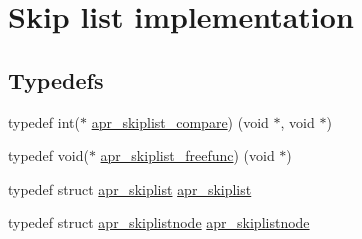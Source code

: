 \hypertarget{group__apr__skiplist}{}\section{Skip list implementation}
\label{group__apr__skiplist}
\subsection*{Typedefs}
\begin{DoxyCompactItemize}
\item 
typedef int($\ast$ \hyperlink{group__apr__skiplist_ga873aa114e692e48c6587277680ceba87}{apr\+\_\+skiplist\+\_\+compare}) (void $\ast$, void $\ast$)
\item 
typedef void($\ast$ \hyperlink{group__apr__skiplist_ga326fdccaf516e5296969fa03bbda3fca}{apr\+\_\+skiplist\+\_\+freefunc}) (void $\ast$)
\item 
typedef struct \hyperlink{group__apr__skiplist_gac79ddf14bb5cb5b6d35961309eadec48}{apr\+\_\+skiplist} \hyperlink{group__apr__skiplist_gac79ddf14bb5cb5b6d35961309eadec48}{apr\+\_\+skiplist}
\item 
typedef struct \hyperlink{group__apr__skiplist_gafb934f577d03de823aa4d62b41399bc0}{apr\+\_\+skiplistnode} \hyperlink{group__apr__skiplist_gafb934f577d03de823aa4d62b41399bc0}{apr\+\_\+skiplistnode}
\end{DoxyCompactItemize}
